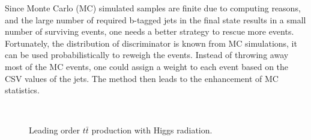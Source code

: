 \documentclass[12pt,a4paper]{article}
\begin{document}
Since Monte Carlo (MC) simulated samples are finite due to computing reasons, and the large number of required b-tagged jets in the final state results in a small number of surviving events, one needs a better strategy to rescue more events.
Fortunately, the distribution of discriminator is known from MC simulations, it can be used probabilistically to reweigh the events.
Instead of throwing away most of the MC events, one could assign a weight to each event based on the CSV values of the jets.
The method then leads to the enhancement of MC statistics.
\vspace*{1em}
\begin{figure}[H]
	\begin{center}
	~~~~~~~~~~
	\caption{Leading order $t\bar{t}$ production with Higgs radiation.}
	\label{fig:ttH}
	\end{center}
\end{figure}
\end{document}
